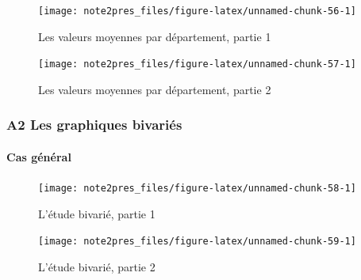 \documentclass[11pt,]{article}
\let\oldparagraph\paragraph
\renewcommand{\paragraph}[1]{\oldparagraph{#1}\mbox{}}
\begin{document}
\FloatBarrier

\begin{figure}[!htbp]

{\centering \texttt{[image: note2pres\_files/figure-latex/unnamed-chunk-56-1]} 

}

\caption{Les valeurs moyennes par département, partie 1}\label{fig:unnamed-chunk-56}
\end{figure}

\FloatBarrier

\FloatBarrier

\begin{figure}[!htbp]

{\centering \texttt{[image: note2pres\_files/figure-latex/unnamed-chunk-57-1]} 

}

\caption{Les valeurs moyennes par département, partie 2}\label{fig:unnamed-chunk-57}
\end{figure}

\FloatBarrier

\newpage

\hypertarget{a2-les-graphiques-bivaries}{%
\subsubsection{A2 Les graphiques
bivariés}\label{a2-les-graphiques-bivaries}}

\hypertarget{cas-general}{%
\paragraph{Cas général}\label{cas-general}}

\FloatBarrier

\begin{figure}[!htbp]

{\centering \texttt{[image: note2pres\_files/figure-latex/unnamed-chunk-58-1]} 

}

\caption{L'étude bivarié, partie 1}\label{fig:unnamed-chunk-58}
\end{figure}

\FloatBarrier

\FloatBarrier

\begin{figure}[!htbp]

{\centering \texttt{[image: note2pres\_files/figure-latex/unnamed-chunk-59-1]} 

}

\caption{L'étude bivarié, partie 2}\label{fig:unnamed-chunk-59}
\end{figure}
\end{document}
